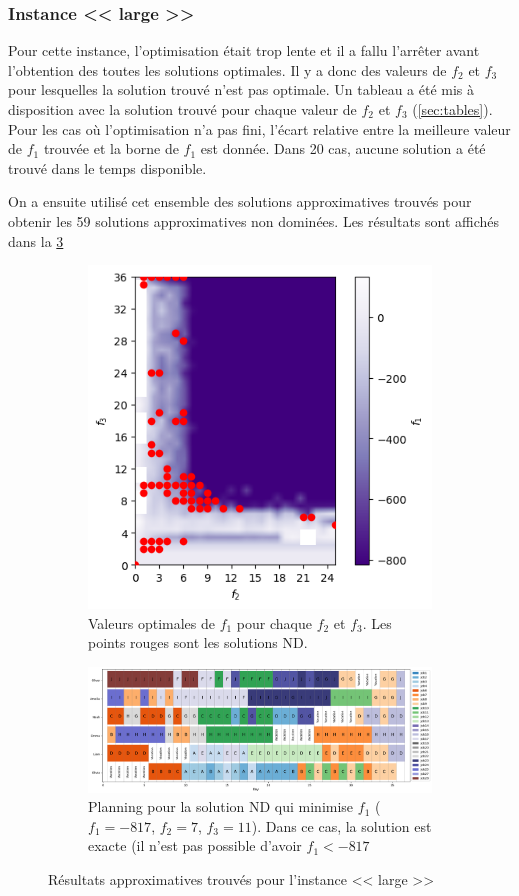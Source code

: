 \documentclass[12pt, a4paper, french, version=last, parskip=half, titlepage]{scrartcl}
\begin{document}
\subsubsection{Instance << large >>}
\label{sec:resultats-large}

Pour cette instance, l'optimisation était trop lente et il a fallu l'arrêter avant l'obtention des toutes les solutions optimales. Il y a donc des valeurs de $f_2$ et $f_3$ pour lesquelles la solution trouvé n'est pas optimale. Un tableau a été mis à disposition avec la solution trouvé pour chaque valeur de $f_2$ et $f_3$ (\cref{sec:tables}). Pour les cas où l'optimisation n'a pas fini, l'écart relative entre la meilleure valeur de $f_1$ trouvée et la borne de $f_1$ est donnée. Dans 20 cas, aucune solution a été trouvé dans le temps disponible.

On a ensuite utilisé cet ensemble des solutions approximatives trouvés pour obtenir les 59 solutions approximatives non dominées. Les résultats sont affichés dans la \cref{fig:large}

\begin{figure}[H]
    \centering
    \begin{subfigure}[t]{\textwidth}
        \centering
        \includegraphics[width=.4\textwidth]{images/plot_large_nd.png}
        \caption{Valeurs optimales de $f_1$ pour chaque $f_2$ et $f_3$. Les points rouges sont les solutions ND.}
        \label{fig:large-nd}
    \end{subfigure}
    \begin{subfigure}[t]{\textwidth}
        \centering
        \includegraphics[width=\textwidth]{images/plot_large_planning.png}
        \caption{Planning pour la solution ND qui minimise $f_1$ ($f_1=-817$, $f_2=7$, $f_3=11$). Dans ce cas, la solution est exacte (il n'est pas possible d'avoir $f_1 < -817$}
        \label{fig:large-planning}
    \end{subfigure}
    \caption{Résultats approximatives trouvés pour l'instance << large >>}
    \label{fig:large}
\end{figure}
\end{document}

